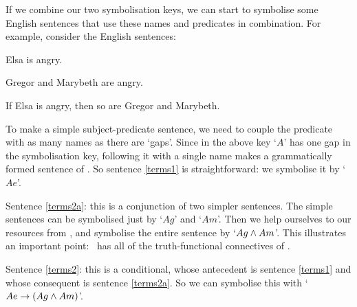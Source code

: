 If we combine our two symbolisation keys, we can start to symbolise some English sentences that use these names and predicates in combination. For example, consider the English sentences:
	\begin{earg}
		\item[\ex{terms1}] Elsa is angry.
		\item[\ex{terms2a}] Gregor and Marybeth are angry.
		\item[\ex{terms2}] If Elsa is angry, then so are Gregor and Marybeth.
	\end{earg}
To make a simple subject-predicate sentence, we need to couple the predicate with as many names as there are `gaps'. Since in the above key `$A$' has one gap in the symbolisation key, following it with a single name makes a grammatically formed sentence of \FOL. So sentence \ref{terms1} is straightforward: we symbolise it by `$Ae$'.

Sentence \ref{terms2a}: this is a conjunction of two simpler sentences. The simple sentences can be symbolised just by `$Ag$' and `$Am$'. Then we help ourselves to our resources from \TFL, and symbolise the entire sentence by `$Ag \wedge Am$'. This illustrates an important point: \FOL\ has all of the truth-functional connectives of \TFL.

Sentence \ref{terms2}: this is a conditional, whose antecedent is sentence \ref{terms1} and whose consequent is sentence \ref{terms2a}. So we can symbolise this with `$Ae \rightarrow (Ag \wedge Am)$'.

